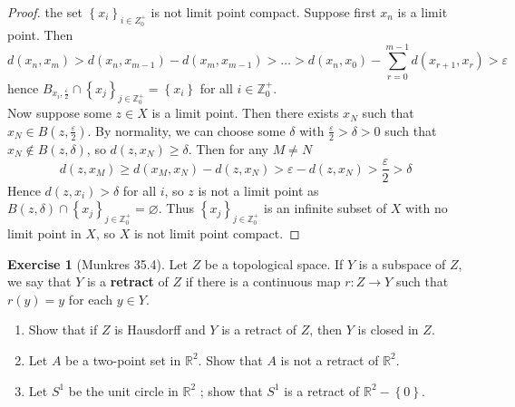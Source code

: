 \documentclass[reqno]{amsart}
\theoremstyle{plain}%
\theoremstyle{definition}
\newtheorem{exercise}[theorem]{Exercise}
\theoremstyle{remark}
\begin{document}
\begin{proof}
      the set
      $\left\{ x_i \right\}_{i \in Z_0^{+}}$ is not limit point compact.
      Suppose first $x_n$ is a limit point. Then
      \[
      d(x_n, x_m) > d(x_n, x_{m-1}) - d\left( x_m, x_{m-1} \right) 
      > \ldots > d\left( x_n, x_{0} \right)  -
      \sum_{r = 0}^{m-1} d\left( x_{r+1}, x_{r} \right) 
      > \varepsilon
      \] 
      hence $B_{x_i, \frac{\varepsilon}{2}} \cap 
      \left\{ x_j \right\}_{j \in \mathbb{Z}_0^{+}} = \left\{ x_i \right\} $ 
      for all $i \in \mathbb{Z}_{0}^{+}$.\\
      Now suppose some $z \in X$ is a limit point. Then
      there exists $x_N$ such that
      $x_N \in B\left( z, \frac{\varepsilon}{2} \right) $. By normality, we can
      choose some $\delta$ with $\frac{\varepsilon}{2} > \delta > 0$ such that
      $x_N \not\in B\left( z, \delta \right) $, so $d\left( z,x_N \right) \ge 
      \delta$. Then for any  $M \neq N$
     \[
     d\left( z,x_M \right) \ge 
     d\left( x_M , x_N \right) - d\left( z, x_N \right) >
     \varepsilon - d\left( z, x_N \right)  > \frac{\varepsilon}{2} 
     > \delta
     \] 
     Hence $d\left( z, x_i \right) > \delta$ for all $i$, so
     $z$ is not a limit point as
     $B \left( z, \delta  \right) \cap 
     \left\{ x_j \right\}_{j \in \mathbb{Z}_0^{+}} = \varnothing$.
     Thus $\left\{ x_j \right\}_{j \in \mathbb{Z}_0^{+}}$ is an
     infinite subset of $X$ with no limit point in $X$, so
     $X$ is not limit point compact.
\end{proof}


\begin{exercise}[Munkres 35.4]
    Let $Z$ be a topological space. If $Y$ is a subspace of
    $Z$, we say that $Y$ is a \textbf{retract} of $Z$ if there
    is a continuous map $r  \colon Z \to Y$ such that
    $r(y) = y $ for each $y \in Y$.
    \begin{enumerate}
        \item Show that if $Z$ is Hausdorff and $Y$ is a retract of $Z$, then
            $Y$ is closed in $Z $.
        \item Let $A$ be a two-point set in $\mathbb{R}^2$. Show that
            $A$ is not a retract of $\mathbb{R}^2$.
        \item Let $S^{1}$ be the unit circle in $\mathbb{R}^2$ ; show that
            $S^{1}$ is a retract of $\mathbb{R}^2 - \left\{ 0 \right\} $.
    \end{enumerate}
\end{exercise}
\end{document}

